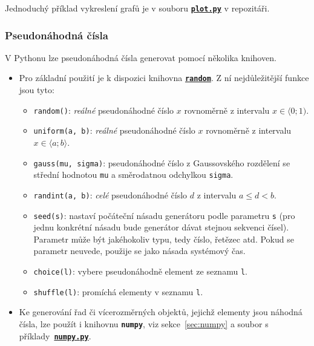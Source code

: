 \documentclass[a4paper,11pt,twoside]{article}
\def\code#1{\textnormal{\texttt{#1}}}
\def\file#1{\textnormal{\textbf{\texttt{#1}}}}
\def\ghfile#1#2{\textnormal{\textbf{\texttt{\href{https://github.com/PavelStransky/PCInPhysics2021/blob/main/#1#2}{#2}}}}}
\theoremstyle{red}
\theoremstyle{green}
\begin{document}
    Jednoduchý příklad vykreslení grafů je v souboru \ghfile{python/basics/}{plot.py} v repozitáři.

\subsubsection{Pseudonáhodná čísla}\label{sec:PseudonahodnaCisla}
    V Pythonu lze pseudonáhodná čísla generovat pomocí několika knihoven.
    \begin{itemize}
        \item 
            Pro základní použití je k dispozici knihovna \file{\href{https://docs.python.org/3/library/random.html}{random}}.
            Z ní nejdůležitější funkce jsou tyto:
            \begin{itemize}
                \item \code{random()}: \emph{reálné} pseudonáhodné číslo $x$ rovnoměrně z intervalu $x\in\langle 0;1)$.
                \item \code{uniform(a, b)}: \emph{reálné} pseudonáhodné číslo $x$ rovnoměrně z intervalu $x\in\langle a;b\rangle$.
                \item \code{gauss(mu, sigma)}: pseudonáhodné číslo z Gaussovského rozdělení se střední hodnotou \code{mu} a směrodatnou odchylkou \code{sigma}. 
                \item \code{randint(a, b)}: \emph{celé} pseudonáhodné číslo $d$ z intervalu $a\leq d<b$.
                \item \code{seed(s)}: nastaví počáteční násadu generátoru podle parametru \code{s} (pro jednu konkrétní násadu bude generátor dávat stejnou sekvenci čísel). 
                Parametr může být jakéhokoliv typu, tedy číslo, řetězec atd. 
                Pokud se parametr neuvede, použije se jako násada systémový čas.
                \item \code{choice(l)}: vybere pseudonáhodně element ze seznamu \code{l}.
                \item \code{shuffle(l)}: promíchá elementy v seznamu \code{l}.
            \end{itemize}

        \item
            Ke generování řad či vícerozměrných objektů, jejichž elementy jsou náhodná čísla, lze použít i knihovnu \file{numpy}, viz sekce~\ref{sec:numpy} a soubor s příklady~\ghfile{python/basics/}{numpy.py}.


\end{itemize}
\end{document}
